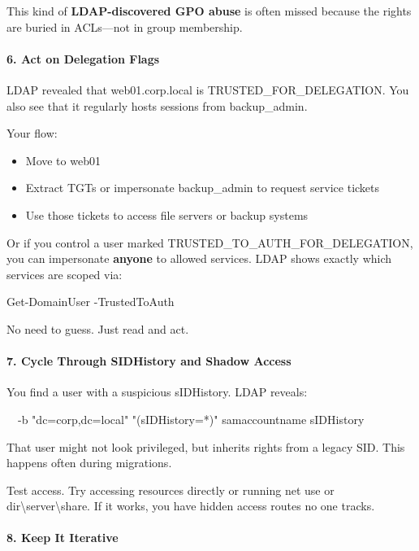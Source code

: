 This kind of \textbf{LDAP-discovered GPO abuse} is often missed because the rights are buried in ACLs—not in group membership.

\paragraph{\textbf{   6. Act on Delegation Flags}}

LDAP revealed that web01.corp.local is TRUSTED\_FOR\_DELEGATION. You also see that it regularly hosts sessions from backup\_admin.

Your flow:

\begin{itemize}
    \item Move to web01

    \item Extract TGTs or impersonate backup\_admin to request service tickets

    \item Use those tickets to access file servers or backup systems

\end{itemize}
Or if you control a user marked TRUSTED\_TO\_AUTH\_FOR\_DELEGATION, you can impersonate \textbf{anyone} to allowed services. LDAP shows exactly which services are scoped via:

Get-DomainUser -TrustedToAuth

No need to guess. Just read and act.

\paragraph{\textbf{   7. Cycle Through SIDHistory and Shadow Access}}

You find a user with a suspicious sIDHistory. LDAP reveals:


  -b "dc=corp,dc=local" "(sIDHistory=*)" samaccountname sIDHistory

That user might not look privileged, but inherits rights from a legacy SID. This happens often during migrations.

Test access. Try accessing resources directly or running net use or dir\textbackslash{}server\textbackslash{}share. If it works, you have hidden access routes no one tracks.

\paragraph{\textbf{8. Keep It Iterative}}

